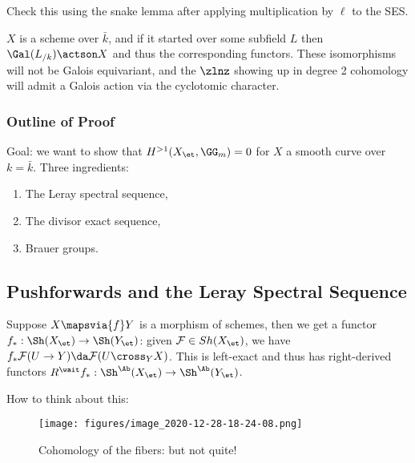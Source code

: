 \begin{exercise}[?]

Check this using the snake lemma after applying multiplication by
\(\ell\) to the SES.

\end{exercise}

\begin{remark}

\(X\) is a scheme over \(\bar k\), and if it started over some subfield
\(L\) then \(\Gal(L_{/k}) \actson X\) and thus the corresponding
functors. These isomorphisms will not be Galois equivariant, and the
\(\zlnz\) showing up in degree 2 cohomology will admit a Galois action
via the cyclotomic character.

\end{remark}

\hypertarget{outline-of-proof}{%
\subsubsection{Outline of Proof}\label{outline-of-proof}}

Goal: we want to show that \(H^{>1}(X_\et, \GG_m) = 0\) for \(X\) a
smooth curve over \(k=\bar k\). Three ingredients:

\begin{enumerate}
\def\labelenumi{\arabic{enumi}.}
\item
  The Leray spectral sequence,
\item
  The divisor exact sequence,
\item
  Brauer groups.
\end{enumerate}

\hypertarget{pushforwards-and-the-leray-spectral-sequence}{%
\subsection{Pushforwards and the Leray Spectral
Sequence}\label{pushforwards-and-the-leray-spectral-sequence}}

Suppose \(X\mapsvia{f} Y\) is a morphism of schemes, then we get a
functor \(f_*:\Sh(X_\et) \to \Sh(Y_\et)\): given
\(\mathcal{F}\in Sh(X_\et)\), we have
\(f_* \mathcal{F}(U\to Y) \da \mathcal{F}(U\cross_Y X)\). This is
left-exact and thus has right-derived functors
\(R^\wait f_*:\Sh^\Ab(X_\et) \to \Sh^\Ab(Y_\et)\).

How to think about this:

\begin{figure}
\centering
\texttt{[image: figures/image\_2020-12-28-18-24-08.png]}
\caption{Cohomology of the fibers: but not quite!}
\end{figure}

